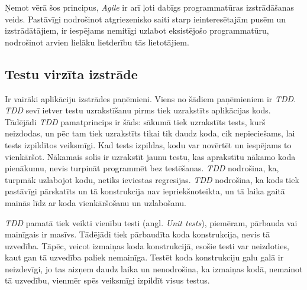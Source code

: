 Ņemot vērā šos principus, \textit{Agile} ir arī ļoti dabīgs programmatūras izstrādāšanas veids. Pastāvīgi nodrošinot atgriezenisko saiti starp ieinteresētajām pusēm un izstrādātājiem, ir iespējams nemitīgi uzlabot eksistējošo programmatūru, nodrošinot arvien lielāku lietderību tās lietotājiem.
\cite{agile-man}


\subsection{Testu virzīta izstrāde}
Ir vairāki aplikāciju izstrādes paņēmieni. Viens no šādiem paņēmieniem ir \textit{TDD}. \textit{TDD} sevī ietver testu uzrakstīšanu pirms tiek uzrakstīts aplikācijas kods. Tādējādi \textit{TDD} pamatprincips ir šāds: sākumā tiek uzrakstīts tests, kurš neizdodas, un pēc tam tiek uzrakstīts tikai tik daudz koda, cik nepieciešams, lai tests izpildītos veiksmīgi. Kad tests izpildas, kodu var novērtēt un iespējams to vienkāršot. Nākamais solis ir uzrakstīt jaunu testu, kas aprakstītu nākamo koda pienākumu, nevis turpināt programmēt bez testēšanas. \textit{TDD} nodrošina, ka, turpmāk uzlabojot kodu, netiks ieviestas regresijas. \textit{TDD} nodrošina, ka kods tiek pastāvīgi pārskatīts un tā konstrukcija nav iepriekšnoteikta, un tā laika gaitā mainās līdz ar koda vienkāršošanu un uzlabošanu.

\textit{TDD} pamatā tiek veikti vienību testi (angl. \textit{Unit tests}), piemēram, pārbauda vai mainīgais ir masīvs. Tādējādi tiek pārbaudīta koda konstrukcija, nevis tā uzvedība. Tāpēc, veicot izmaiņas koda konstrukcijā, esošie testi var neizdoties, kaut gan tā uzvedība paliek nemainīga. Testēt koda konstrukciju galu galā ir neizdevīgi, jo tas aizņem daudz laika un nenodrošina, ka izmaiņas kodā, nemainot tā uzvedību, vienmēr spēs veiksmīgi izpildīt visus testus. \cite[1. nodaļa]{chelimsky2010Rspec}

